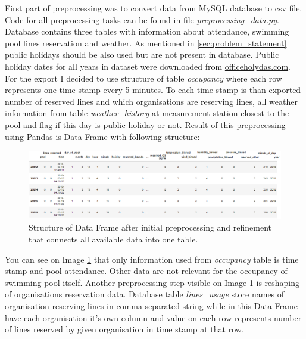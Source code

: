 \documentclass{article}
\begin{document}
First part of preprocessing was to convert data from MySQL database to csv file. Code for all preprocessing tasks can be found in file \emph{preprocessing\_data.py}. Database contains three tables with information about attendance, swimming pool lines reservation and weather. As mentioned in \ref{sec:problem_statement} public holidays should be also used but are not present in database. Public holiday dates for all years in dataset were downloaded from \href{https://www.officeholidays.com/countries/czech-republic}{officeholydas.com}. For the export I decided to use structure of table \emph{occupancy} where each row represents one time stamp every 5 minutes. To each time stamp is than exported number of reserved lines and which organisations are reserving lines, all weather information from table \emph{weather\_history} at measurement station closest to the pool and flag if this day is public holiday or not. Result of this preprocessing using Pandas is Data Frame with following structure:

\begin{figure}[h!]
\centering
\includegraphics[width=16cm]{imgs/dataframe_head}
\caption{Structure of Data Frame after initial preprocessing and refinement that connects all available data into one table.}
\label{fig:dataframe_structure}
\end{figure}

You can see on Image \ref{fig:dataframe_structure} that only information used from \emph{occupancy} table is time stamp and pool attendance. Other data are not relevant for the occupancy of swimming pool itself. Another preprocessing step visible on Image \ref{fig:dataframe_structure} is reshaping of organisations reservation data. Database table \emph{lines\_usage} store names of organisation reserving lines in comma separated string while in this Data Frame have each organisation it's own column and value on each row represents number of lines reserved by given organisation in time stamp at that row. 
\end{document}

